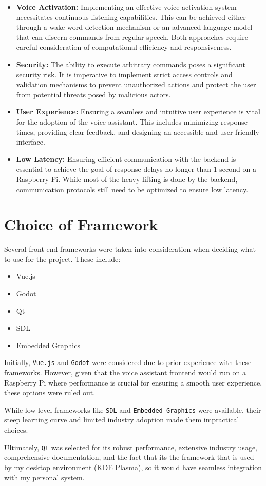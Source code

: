 \begin{itemize}
    \item \textbf{Voice Activation:} Implementing an effective voice activation system necessitates
    continuous listening capabilities. This can be achieved either through a wake-word detection
    mechanism or an advanced language model that can discern commands from regular speech.
    Both approaches require careful consideration of computational efficiency and responsiveness.

    \item \textbf{Security:} The ability to execute arbitrary commands poses a significant security
    risk. It is imperative to implement strict access controls and validation mechanisms to prevent
    unauthorized actions and protect the user from potential threats posed by malicious actors.

    \item \textbf{User Experience:} Ensuring a seamless and intuitive user experience is vital for
    the adoption of the voice assistant. This includes minimizing response times, providing clear
    feedback, and designing an accessible and user-friendly interface.

    \item \textbf{Low Latency:} Ensuring efficient communication with
    the backend is essential to achieve the goal of response delays no longer than 1 second on a Raspberry Pi.
    While most of the heavy lifting is done by the backend, communication protocols still need to be optimized
    to ensure low latency.
\end{itemize}

\section{Choice of Framework}
Several front-end frameworks were taken into consideration when deciding what to use for the project. These include:

\begin{itemize}
    \item Vue.js
    \item Godot
    \item Qt
    \item SDL
    \item Embedded Graphics
\end{itemize}

Initially, \texttt{Vue.js} and \texttt{Godot} were considered due to prior experience with these frameworks.
However, given that the voice assistant frontend would run on a Raspberry Pi where performance is crucial
for ensuring a smooth user experience, these options were ruled out.

While low-level frameworks like \texttt{SDL} and \texttt{Embedded Graphics} were available,
their steep learning curve and limited industry adoption made them impractical choices.

Ultimately, \texttt{Qt} was selected for its robust performance, extensive industry usage,
comprehensive documentation, and the fact that its the framework that is used by my desktop environment
(KDE Plasma), so it would have seamless integration with my personal system.
